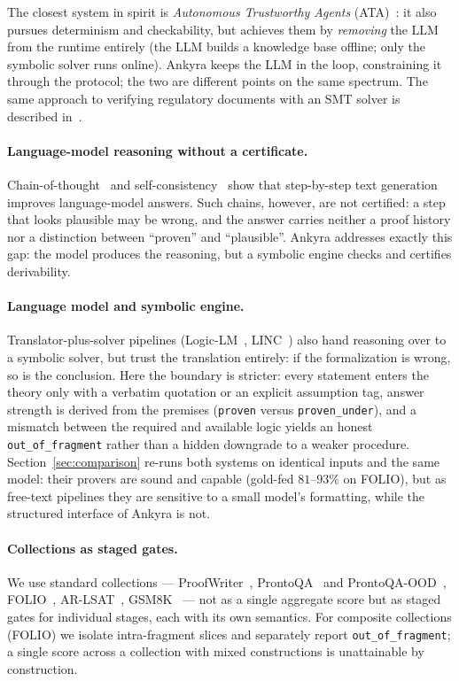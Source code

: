 \documentclass[11pt,a4paper]{article}
\begin{document}
The closest system in spirit is \emph{Autonomous Trustworthy Agents} (ATA)~\cite{ata}: it
also pursues determinism and checkability, but achieves them by \emph{removing} the LLM from
the runtime entirely (the LLM builds a knowledge base offline; only the symbolic solver runs
online). Ankyra keeps the LLM in the loop, constraining it through the protocol; the two are
different points on the same spectrum. The same approach to verifying regulatory documents
with an SMT solver is described in~\cite{nsc}.

\paragraph{Language-model reasoning without a certificate.} Chain-of-thought~\cite{cot} and
self-consistency~\cite{selfconsistency} show that step-by-step text generation improves
language-model answers. Such chains, however, are not certified: a step that looks plausible
may be wrong, and the answer carries neither a proof history nor a distinction between
``proven'' and ``plausible''. Ankyra addresses exactly this gap: the model produces the
reasoning, but a symbolic engine checks and certifies derivability.

\paragraph{Language model and symbolic engine.} Translator-plus-solver pipelines
(Logic-LM~\cite{logiclm}, LINC~\cite{linc}) also hand reasoning over to a symbolic solver,
but trust the translation entirely: if the formalization is wrong, so is the conclusion.
Here the boundary is stricter: every statement enters the theory only with a verbatim
quotation or an explicit assumption tag, answer strength is derived from the premises
(\texttt{proven} versus \texttt{proven\_under}), and a mismatch between the required and
available logic yields an honest \texttt{out\_of\_fragment} rather than a hidden downgrade
to a weaker procedure. Section~\ref{sec:comparison} re-runs both systems on identical inputs
and the same model: their provers are sound and capable (gold-fed $81$--$93\%$ on FOLIO),
but as free-text pipelines they are sensitive to a small model's formatting, while the
structured interface of Ankyra is not.

\paragraph{Collections as staged gates.} We use standard collections ---
ProofWriter~\cite{proofwriter}, ProntoQA~\cite{prontoqa} and
ProntoQA-OOD~\cite{prontoqaood}, FOLIO~\cite{folio}, AR-LSAT~\cite{arlsat},
GSM8K~\cite{gsm8k} --- not as a single aggregate score but as staged gates for individual
stages, each with its own semantics. For composite collections (FOLIO) we isolate
intra-fragment slices and separately report \texttt{out\_of\_fragment}; a single score
across a collection with mixed constructions is unattainable by construction.
\end{document}
